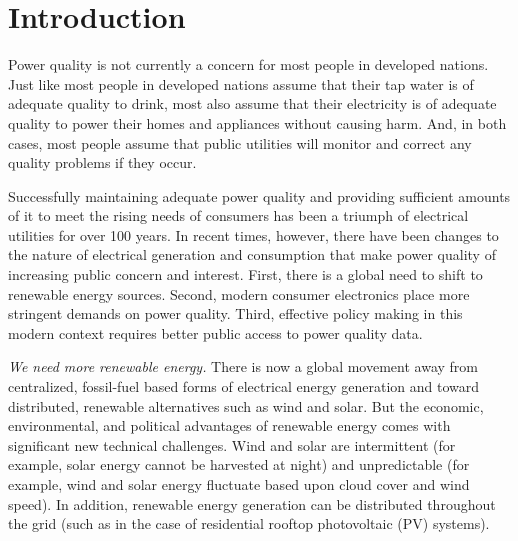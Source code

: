 \documentclass[preprints,article,accept,moreauthors,pdftex]{Definitions/mdpi}
\begin{document}

\section{Introduction}


Power quality is not currently a concern for most people in developed nations. Just like most people in developed nations assume that their tap water is of adequate quality to drink, most also assume that their electricity is of adequate quality to power their homes and appliances without causing harm. And, in both cases, most people assume that public utilities will monitor and correct any quality problems if they occur.



Successfully maintaining adequate power quality and providing sufficient amounts of it to meet the rising needs of consumers has been a triumph of electrical utilities for over 100 years. In recent times, however, there have been changes to the nature of electrical generation and consumption that make power quality of increasing public concern and interest. First, there is a global need to shift to renewable energy sources. Second, modern consumer electronics place more stringent demands on power quality.  Third, effective policy making in this modern context requires better public access to power quality data.

{\em We need more renewable energy.} There is now a global movement away from centralized, fossil-fuel based forms of electrical energy generation and toward distributed, renewable alternatives such as wind and solar. But the economic, environmental, and political advantages of renewable energy comes with significant new technical challenges. Wind and solar are intermittent (for example, solar energy cannot be harvested at night) and unpredictable (for example, wind and solar energy fluctuate based upon cloud cover and wind speed). In addition, renewable energy generation can be distributed throughout the grid (such as in the case of residential rooftop photovoltaic (PV) systems).
\end{document}
